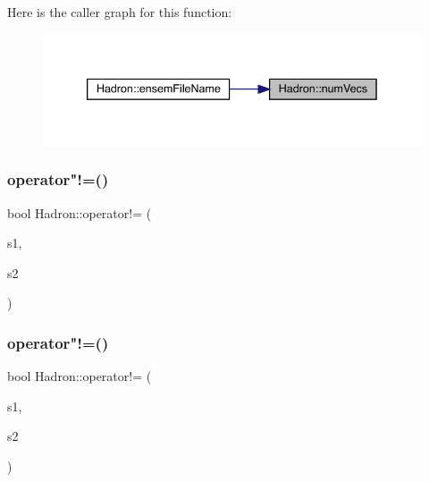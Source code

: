 Here is the caller graph for this function\+:\nopagebreak
\begin{figure}[H]
\begin{center}
\leavevmode
\includegraphics[width=339pt]{d1/daf/namespaceHadron_afea9ddb2112da9cb61d87881799fff49_icgraph}
\end{center}
\end{figure}
\mbox{\label{namespaceHadron_aa7483984b4c081a23ba486c97ca05f5a}} 
\subsubsection{\texorpdfstring{operator"!=()}{operator!=()}\hspace{0.1cm}{\footnotesize\ttfamily [1/3]}}
{\footnotesize\ttfamily bool Hadron\+::operator!= (\begin{DoxyParamCaption}\item[{const \mbox{\hyperlink{structHadron_1_1QuarkNum__t}{Quark\+Num\+\_\+t}} \&}]{s1,  }\item[{const \mbox{\hyperlink{structHadron_1_1QuarkNum__t}{Quark\+Num\+\_\+t}} \&}]{s2 }\end{DoxyParamCaption})}

\mbox{\label{namespaceHadron_aa8d535bf12152ca7f5f44d089e5db4b1}} 
\subsubsection{\texorpdfstring{operator"!=()}{operator!=()}\hspace{0.1cm}{\footnotesize\ttfamily [2/3]}}
{\footnotesize\ttfamily bool Hadron\+::operator!= (\begin{DoxyParamCaption}\item[{const \mbox{\hyperlink{structHadron_1_1KeyHadronNPartNPtConnGraph__t}{Key\+Hadron\+N\+Part\+N\+Pt\+Conn\+Graph\+\_\+t}} \&}]{s1,  }\item[{const \mbox{\hyperlink{structHadron_1_1KeyHadronNPartNPtConnGraph__t}{Key\+Hadron\+N\+Part\+N\+Pt\+Conn\+Graph\+\_\+t}} \&}]{s2 }\end{DoxyParamCaption})}



